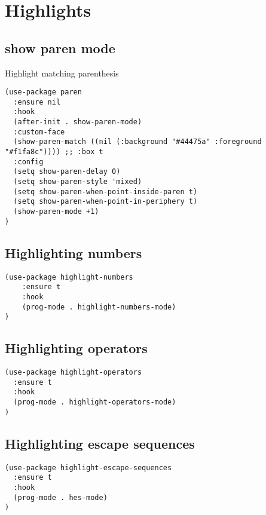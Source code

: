 \documentclass[11pt]{article}
\begin{document}
\section*{Highlights}
\label{sec:orgb4206d6}

\subsection*{show paren mode}
\label{sec:orgdee0e80}

Highlight matching parenthesis

\begin{verbatim}
(use-package paren
  :ensure nil
  :hook
  (after-init . show-paren-mode)
  :custom-face
  (show-paren-match ((nil (:background "#44475a" :foreground "#f1fa8c")))) ;; :box t
  :config
  (setq show-paren-delay 0)
  (setq show-paren-style 'mixed)
  (setq show-paren-when-point-inside-paren t)
  (setq show-paren-when-point-in-periphery t)
  (show-paren-mode +1)
)
\end{verbatim}

\subsection*{Highlighting numbers}
\label{sec:orgbc71d21}

\begin{verbatim}
(use-package highlight-numbers
    :ensure t
    :hook
    (prog-mode . highlight-numbers-mode)
)
\end{verbatim}

\subsection*{Highlighting operators}
\label{sec:org6a67b12}

\begin{verbatim}
(use-package highlight-operators
  :ensure t
  :hook
  (prog-mode . highlight-operators-mode)
)
\end{verbatim}

\subsection*{Highlighting escape sequences}
\label{sec:org34185a5}

\begin{verbatim}
(use-package highlight-escape-sequences
  :ensure t
  :hook
  (prog-mode . hes-mode)
)
\end{verbatim}
\end{document}
